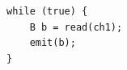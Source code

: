 \documentclass[varwidth=4.8cm]{standalone}
\begin{document}
\begin{verbatim}
while (true) {
	B b = read(ch1);
	emit(b);
}
\end{verbatim}
\end{document}
